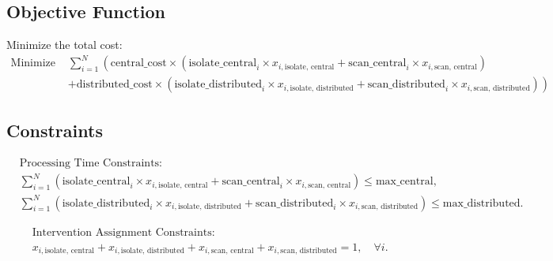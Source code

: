 \documentclass{article}
\begin{document}
\subsection*{Objective Function}
Minimize the total cost:
\begin{align*}
    \text{Minimize } & \sum_{i=1}^{N} \left( \text{central\_cost} \times (\text{isolate\_central}_i \times x_{i, \text{isolate, central}} + \text{scan\_central}_i \times x_{i, \text{scan, central}}) \right. \\
    & \left. + \text{distributed\_cost} \times (\text{isolate\_distributed}_i \times x_{i, \text{isolate, distributed}} + \text{scan\_distributed}_i \times x_{i, \text{scan, distributed}}) \right)
\end{align*}

\subsection*{Constraints}
\begin{align*}
    &\text{Processing Time Constraints:} \\
    &\sum_{i=1}^{N} (\text{isolate\_central}_i \times x_{i, \text{isolate, central}} + \text{scan\_central}_i \times x_{i, \text{scan, central}}) \leq \text{max\_central}, \\
    &\sum_{i=1}^{N} (\text{isolate\_distributed}_i \times x_{i, \text{isolate, distributed}} + \text{scan\_distributed}_i \times x_{i, \text{scan, distributed}}) \leq \text{max\_distributed}.
\end{align*}

\begin{align*}
    &\text{Intervention Assignment Constraints:} \\
    &x_{i, \text{isolate, central}} + x_{i, \text{isolate, distributed}} + x_{i, \text{scan, central}} + x_{i, \text{scan, distributed}} = 1, \quad \forall i.
\end{align*}
\end{document}
